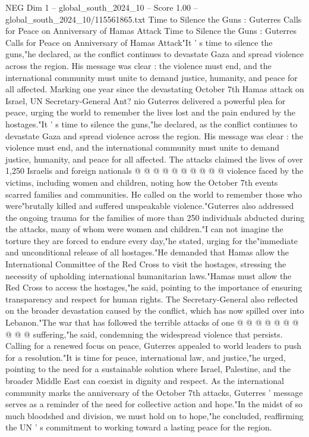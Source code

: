 \begin{textsample}{NEG Dim 1 – global\_south\_2024\_10 – Score 1.00 – global\_south\_2024\_10/115561865.txt}  \label{ex:f1_neg_430}
Time to Silence the Guns : Guterres Calls for Peace on Anniversary of Hamas Attack Time to Silence the Guns : Guterres Calls for Peace on Anniversary of Hamas Attack"It ' s time to silence the guns,"he declared, as the conflict continues to devastate Gaza and spread violence across the region.
His message was clear : the violence must end, and the international community must unite to demand justice, humanity, and peace for all affected.
Marking one year since the devastating October 7th Hamas attack on Israel, UN Secretary-General Ant? nio Guterres delivered a powerful plea for peace, urging the world to remember the lives lost and the pain endured by the hostages."It ' s time to silence the guns,"he declared, as the conflict continues to devastate Gaza and spread violence across the region.
His message was clear : the violence must end, and the international community must unite to demand justice, humanity, and peace for all affected.
The attacks claimed the lives of over 1,250 Israelis and foreign nationals @ @ @ @ @ @ @ @ @ @ violence faced by the victims, including women and children, noting how the October 7th events scarred families and communities.
He called on the world to remember those who were"brutally killed and suffered unspeakable violence."Guterres also addressed the ongoing trauma for the families of more than 250 individuals abducted during the attacks, many of whom were women and children."I can not imagine the torture they are forced to endure every day,"he stated, urging for the"immediate and unconditional release of all hostages."He demanded that Hamas allow the International Committee of the Red Cross to visit the hostages, stressing the necessity of upholding international humanitarian laws."Hamas must allow the Red Cross to access the hostages,"he said, pointing to the importance of ensuring transparency and respect for human rights.
The Secretary-General also reflected on the broader devastation caused by the conflict, which has now spilled over into Lebanon."The war that has followed the terrible attacks of one @ @ @ @ @ @ @ @ @ @ suffering,"he said, condemning the widespread violence that persists.
Calling for a renewed focus on peace, Guterres appealed to world leaders to push for a resolution."It is time for peace, international law, and justice,"he urged, pointing to the need for a sustainable solution where Israel, Palestine, and the broader Middle East can coexist in dignity and respect.
As the international community marks the anniversary of the October 7th attacks, Guterres ' message serves as a reminder of the need for collective action and hope."In the midst of so much bloodshed and division, we must hold on to hope,"he concluded, reaffirming the UN ' s commitment to working toward a lasting peace for the region.

\end{textsample}
